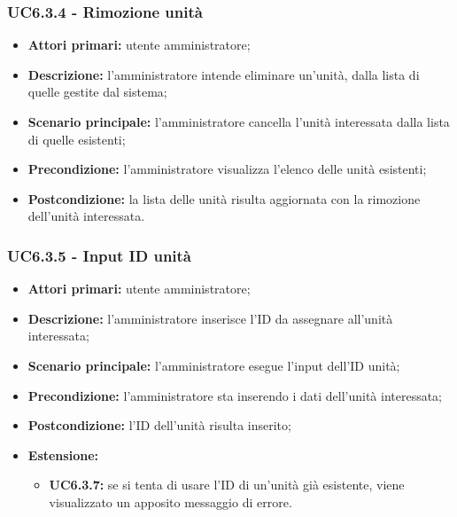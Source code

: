 \subsubsection{UC6.3.4 - Rimozione unità}
	\begin{itemize}
		\item \textbf{Attori primari:} utente amministratore;
		\item \textbf{Descrizione:} l'amministratore intende eliminare un'unità, dalla lista di quelle gestite dal sistema;
		\item \textbf{Scenario principale:} l'amministratore cancella l'unità interessata dalla lista di quelle esistenti;
		\item \textbf{Precondizione:} l'amministratore visualizza l'elenco delle unità esistenti;
		\item \textbf{Postcondizione:} la lista delle unità risulta aggiornata con la rimozione dell'unità interessata.
	\end{itemize}

\subsubsection{UC6.3.5 - Input ID unità}
	\begin{itemize}
		\item \textbf{Attori primari:} utente amministratore;
		\item \textbf{Descrizione:} l'amministratore inserisce l'ID da assegnare all'unità interessata;
		\item \textbf{Scenario principale:} l'amministratore esegue l'input dell'ID unità;
		\item \textbf{Precondizione:} l'amministratore sta inserendo i dati dell'unità interessata;
		\item \textbf{Postcondizione:} l'ID dell'unità risulta inserito;
		\item \textbf{Estensione:}
		\begin{itemize}
			\item \textbf{UC6.3.7:} se si tenta di usare l'ID di un'unità già esistente, viene visualizzato un apposito messaggio di errore.
		\end{itemize}
	\end{itemize}

